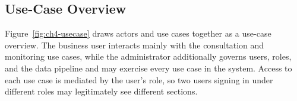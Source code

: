 \subsection{Use-Case Overview}

Figure~\ref{fig:ch4-usecase} draws actors and use cases together as a use-case overview. The
business user interacts mainly with the consultation and monitoring use cases, while the
administrator additionally governs users, roles, and the data pipeline and may exercise every use
case in the system. Access to each use case is mediated by the user's role, so two users signing in
under different roles may legitimately see different sections.

